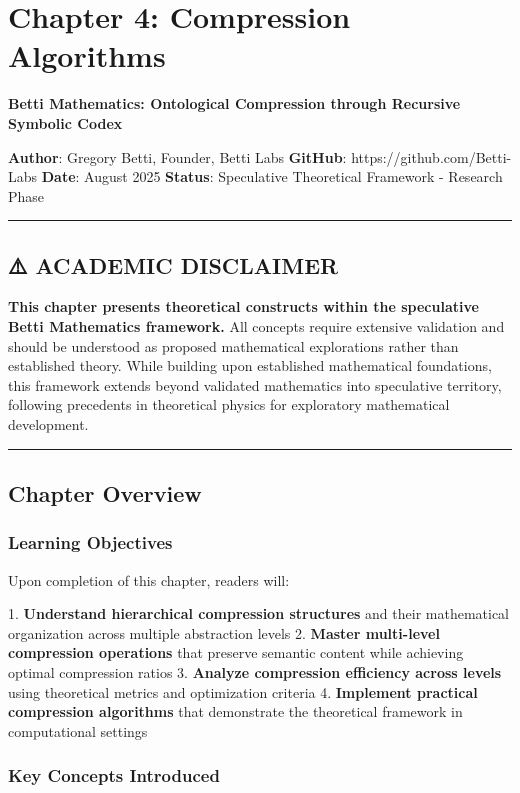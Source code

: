 \chapter{Chapter 4: Compression Algorithms}

\textbf{Betti Mathematics: Ontological Compression through Recursive Symbolic Codex}

\textbf{Author}: Gregory Betti, Founder, Betti Labs  
\textbf{GitHub}: https://github.com/Betti-Labs  
\textbf{Date}: August 2025  
\textbf{Status}: Speculative Theoretical Framework - Research Phase

\hrule

\section{⚠️ ACADEMIC DISCLAIMER}

\textbf{This chapter presents theoretical constructs within the speculative Betti Mathematics framework.} All concepts require extensive validation and should be understood as proposed mathematical explorations rather than established theory. While building upon established mathematical foundations, this framework extends beyond validated mathematics into speculative territory, following precedents in theoretical physics for exploratory mathematical development.

\hrule

\section{Chapter Overview}

\subsection{Learning Objectives}

Upon completion of this chapter, readers will:

1. \textbf{Understand hierarchical compression structures} and their mathematical organization across multiple abstraction levels
2. \textbf{Master multi-level compression operations} that preserve semantic content while achieving optimal compression ratios
3. \textbf{Analyze compression efficiency across levels} using theoretical metrics and optimization criteria
4. \textbf{Implement practical compression algorithms} that demonstrate the theoretical framework in computational settings

\subsection{Key Concepts Introduced}

